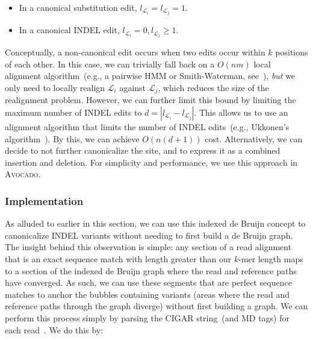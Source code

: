 \documentclass{bioinfo}
\begin{document}
\begin{methods}
\begin{itemize}
\item In a canonical substitution edit, $l_{\mathcal{L}_i} = l_{\mathcal{L}_j} = 1$.
\item In a canonical INDEL edit, $l_{\mathcal{L}_i} = 0, l_{\mathcal{L}_j} \ge 1$.
\end{itemize}

Conceptually, a non-canonical edit occurs when two edits occur within $k$ positions of each other. In
this case, we can trivially fall back on a $O(nm)$ local alignment algorithm~(e.g., a pairwise HMM or
Smith-Waterman, see~\citet{durbin98, smith81}), \emph{but} we only need to locally realign
$\mathcal{L}_i$ against $\mathcal{L}_j$, which reduces the size of the realignment problem. However, we
can further limit this bound by limiting the maximum number of INDEL edits to $d = | l_{\mathcal{L}_i} -
l_{\mathcal{L}_j} |$. This allows us to use an alignment algorithm that limits the number of INDEL
edits~(e.g., Ukkonen's algorithm~\citep{ukkonen85}). By this, we can achieve $O(n(d + 1))$ cost.
Alternatively, we can decide to not further canonicalize the site, and to express it as a combined
insertion and deletion. For simplicity and performance, we use this approach in \textsc{Avocado}.

\subsubsection{Implementation}
\label{sec:implementation}

As alluded to earlier in this section, we can use this indexed de Bruijn concept
to canonicalize INDEL variants without needing to first build a de Bruijn graph.
The insight behind this observation is simple: any section of a read alignment
that is an exact sequence match with length greater than our $k$-mer length maps
to a section of the indexed de Bruijn graph where the read and reference paths
have converged. As such, we can use these segments that are perfect sequence
matches to anchor the bubbles containing variants (areas where the read and
reference paths through the graph diverge) without first building a graph.
We can perform this process simply by parsing the CIGAR string~(and MD tags)
for each read~\citep{li09}. We do this by:


\end{methods}
\end{document}
